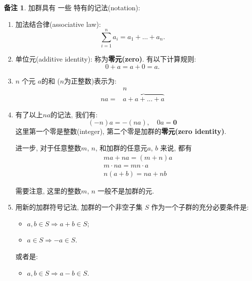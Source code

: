 \documentclass[utf8]{ctexbook}
\theoremstyle{definition}
\newtheorem{memo}{备注}[section]
\begin{document}
\begin{memo}
加群具有 一些 特有的记法(notation):
\begin{enumerate}
\item{加法结合律(associative law): $$ \sum_{i=1} ^n a_i = a_1 + \ldots + a_n . $$}
\item{单位元(additive identity): 称为\textbf{零元(zero)}. 有以下计算规则:
$$ 0 + a = a + 0 = a .$$
}
\item{$n$ 个元 $a$的和 ($n$为正整数)表示为:
\begin{equation}
\begin{array}{cc}
 & n \\ 
 n a  = & \overbrace{a + a + ... + a} 
\end{array}
\end{equation}
}
\item{有了以上$na$的记法, 我们有:
\begin{equation}
(-n)a = - (na), \quad 0 a = \mathbf{0}
\end{equation}
这里第一个零是整数(integer), 第二个零是加群的\textbf{零元(zero identity)}.

进一步, 对于任意整数$m$, $n$, 和加群的任意元$a$, $b$ 来说, 都有
\begin{eqnarray}
& & ma + na = (m+n) a \\
& & m \cdot n a = m n \cdot a \\
& & n(a+b) = na + nb 
\end{eqnarray} 

需要注意, 这里的整数$m$, $n$ 一般不是加群的元. 
}
\item{用新的加群符号记法, 加群的一个非空子集 $S$ 作为一个子群的充分必要条件是:
\begin{itemize}
\item{$a, b \in S \Rightarrow a + b \in S$;}
\item{$a \in S \Rightarrow -a \in S$.}

\end{itemize}
或者是:
\begin{itemize}
\item{$a, b \in S \Rightarrow a-b \in S$.}
\end{itemize}
}
\end{enumerate}
\end{memo}
\end{document}
